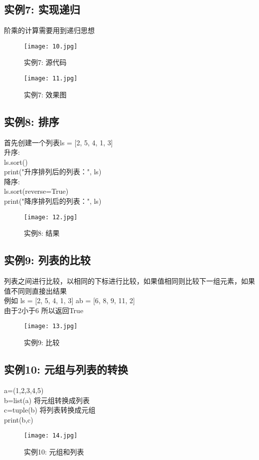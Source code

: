 \documentclass[a4paper, 12pt]{article}
\begin{document}
        \subsection{实例7: 实现递归}
        阶乘的计算需要用到递归思想
        \begin{figure}[h!]
          \centering
          \texttt{[image: 10.jpg]}
          \caption{实例7: 源代码 }
        \end{figure}
        \begin{figure}[h!]
          \centering
          \texttt{[image: 11.jpg]}
          \caption{实例7: 效果图 }
        \end{figure}
        \newpage
        \subsection{实例8: 排序}
        \noindent 首先创建一个列表ls = [2, 5, 4, 1, 3]\\
        升序:\\
        ls.sort()\\
        print("升序排列后的列表：", ls)\\
        降序:\\
        ls.sort(reverse=True)\\
        print("降序排列后的列表：", ls)
        \begin{figure}[h!]
          \centering
          \texttt{[image: 12.jpg]}
          \caption{实例8: 结果 }
        \end{figure}
        \subsection{实例9: 列表的比较}
        \noindent 列表之间进行比较，以相同的下标进行比较，如果值相同则比较下一组元素，如果值不同则直接出结果\\
        例如 ls = [2, 5, 4, 1, 3]
        ab = [6, 8, 9, 11, 2]\\
        由于2小于6 所以返回True
        \begin{figure}[h!]
          \centering
          \texttt{[image: 13.jpg]}
          \caption{实例9: 比较 }
        \end{figure}
        \subsection{实例10: 元组与列表的转换}
        \noindent a=(1,2,3,4,5)\\
        b=list(a) 将元组转换成列表\\
        c=tuple(b) 将列表转换成元组\\
        print(b,c)
        \begin{figure}[h!]
          \centering
          \texttt{[image: 14.jpg]}
          \caption{实例10: 元组和列表 }
        \end{figure}
\end{document}
